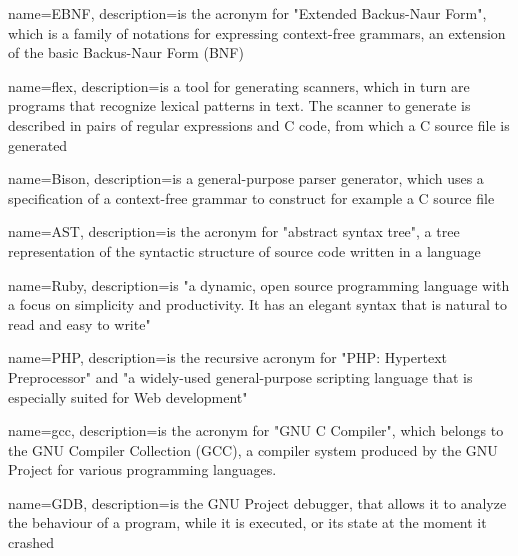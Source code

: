 {
	name={EBNF},
	description={is the acronym for "Extended Backus-Naur Form", which is a family of notations for expressing context-free grammars, an extension of the basic Backus-Naur Form (BNF) \citep{glebnf}}
}

{
	name={flex},
	description={is a tool for generating scanners, which in turn are programs that recognize lexical patterns in text. The scanner to generate is described in pairs of regular expressions and C code, from which a C source file is generated \citep{glflex}}
}

{
	name={Bison},
	description={is a general-purpose parser generator, which uses a specification of a context-free grammar to construct for example a C source file \citep{glbison}}
}

{
	name={AST},
	description={is the acronym for "abstract syntax tree", a tree representation of the syntactic structure of source code written in a language \citep{glast}}
}

{
	name={Ruby},
	description={is "a dynamic, open source programming language with a focus on simplicity and productivity. It has an elegant syntax that is natural to read and easy to write" \citep{glruby}}
}

{
	name={PHP},
	description={is the recursive acronym for "PHP: Hypertext Preprocessor" and "a widely-used general-purpose scripting language that is especially suited for Web development" \citep{glphp}}
}

{
	name={gcc},
	description={is the acronym for "GNU C Compiler", which belongs to the GNU Compiler Collection (GCC), a compiler system produced by the GNU Project for various programming languages. \citep{glgcc}}
}

{
	name={GDB},
	description={is the GNU Project debugger, that allows it to analyze the behaviour of a program, while it is executed, or its state at the moment it crashed \citep{glgdb}}
}

